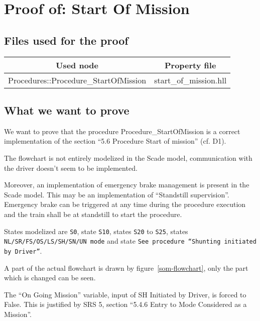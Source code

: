 \section{Proof of: Start Of Mission}
\subsection{Files used for the proof}
\begin{tabular}{|c|c|}
\hline
Used node & Property file \\ \hline
Procedures::Procedure\_StartOfMission & start\_of\_mission.hll \\
\hline
\end{tabular}

\subsection{What we want to prove}
We want to prove that the procedure Procedure\_StartOfMission is a
correct implementation of the section ``5.6 Procedure Start of
mission'' (cf. D1).

The flowchart is not entirely modelized in the Scade model,
communication with the driver doesn't seem to be implemented.

Moreover, an implementation of emergency brake management is present in
the Scade model. This may be an implementation of ``Standstill
supervision''. Emergency brake can be triggered at any time during the
procedure execution and the train shall be at standstill to start the
procedure.

States modelized are \texttt{S0}, state \texttt{S10}, states
\texttt{S20} to \texttt{S25}, states \texttt{NL/SR/FS/OS/LS/SH/SN/UN
  mode} and state \texttt{See procedure ``Shunting initiated by
  Driver''}. 

A part of the actual flowchart is drawn by figure~\ref{som-flowchart},
only the part which is changed can be seen.

The ``On Going Mission'' variable, input of SH Initiated by Driver, is
forced to False. This is justified by SRS 5, section ``5.4.6 Entry to
Mode Considered as a Mission''.

